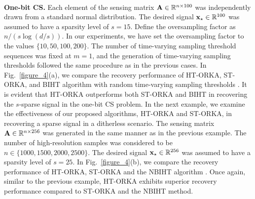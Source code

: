 \documentclass[12pt,draftcls,onecolumn]{IEEEtran}
\begin{document}
\\
\textbf{One-bit CS.} Each element of the sensing matrix $\mathbf{A}\in\mathbb{R}^{n\times 100}$ was independently drawn from a standard normal distribution. The desired signal $\mathbf{x}_{\star}\in\mathbb{R}^{100}$ was assumed to have a sparsity level of $s=15$. Define the oversampling factor as $n/(s\log(d/s))$. In our experiments, we have set the oversampling factor to the values $\{10,50,100,200\}$. The number of time-varying sampling threshold sequences was fixed at $m=1$, and the generation of time-varying sampling thresholds followed the same procedure as in the previous cases. In Fig.~\ref{figure_4}(a), we compare the recovery performance of HT-ORKA, ST-ORKA, and BIHT algorithm with random time-varying sampling thresholds \cite{baraniuk2017exponential}. It is evident that HT-ORKA outperforms both ST-ORKA and BIHT in recovering the $s$-sparse signal in the one-bit CS problem. In the next example, we examine the effectiveness of our proposed algorithms, HT-ORKA and ST-ORKA, in recovering a sparse signal in a ditherless scenario. The sensing matrix $\mathbf{A}\in\mathbb{R}^{n\times 256}$ was generated in the same manner as in the previous example. The number of high-resolution samples was considered to be $n\in\{1000,1500,2000,2500\}$. The desired signal $\mathbf{x}_{\star}\in\mathbb{R}^{256}$ was assumed to have a sparsity level of $s=25$. In Fig.~\ref{figure_4}(b), we compare the recovery performance of HT-ORKA, ST-ORKA and the NBIHT algorithm \cite{friedlander2021nbiht}. Once again, similar to the previous example, HT-ORKA exhibits superior recovery performance compared to ST-ORKA and the NBIHT method.
\end{document}
